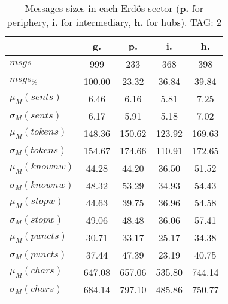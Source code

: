 \begin{table}[h!]
\begin{center}
\begin{tabular}{| l | c | c | c | c |}\hline
 & g. & p. & i. & h. \\\hline
$msgs$ & 999  & 233  & 368  & 398 \\\hline
$msgs_{\%}$ & 100.00  & 23.32  & 36.84  & 39.84 \\\hline
$\mu_M(sents)$ & 6.46  & 6.16  & 5.81  & 7.25 \\\hline
$\sigma_M(sents)$ & 6.17  & 5.91  & 5.18  & 7.02 \\\hline
$\mu_M(tokens)$ & 148.36  & 150.62  & 123.92  & 169.63 \\\hline
$\sigma_M(tokens)$ & 154.67  & 174.66  & 110.91  & 172.65 \\\hline
$\mu_M(knownw)$ & 44.28  & 44.20  & 36.50  & 51.52 \\\hline
$\sigma_M(knownw)$ & 48.32  & 53.29  & 34.93  & 54.43 \\\hline
$\mu_M(stopw)$ & 44.63  & 39.75  & 36.96  & 54.58 \\\hline
$\sigma_M(stopw)$ & 49.06  & 48.48  & 36.06  & 57.41 \\\hline
$\mu_M(puncts)$ & 30.71  & 33.17  & 25.17  & 34.38 \\\hline
$\sigma_M(puncts)$ & 37.44  & 47.39  & 23.19  & 40.75 \\\hline
$\mu_M(chars)$ & 647.08  & 657.06  & 535.80  & 744.14 \\\hline
$\sigma_M(chars)$ & 684.14  & 797.10  & 485.86  & 750.77 \\\hline
\end{tabular}
\caption{Messages sizes in each Erd\"os sector ({{\bf p.}} for periphery, {{\bf i.}} for intermediary, {{\bf h.}} for hubs). TAG: 2}
\end{center}
\end{table}